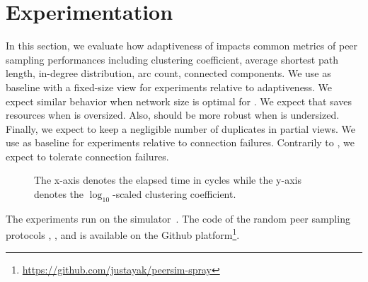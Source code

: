 \section{Experimentation}
\label{sec:experiments}

In this section, we evaluate how adaptiveness of \SPRAY impacts common metrics
of peer sampling performances including clustering coefficient, average
shortest path length, in-degree distribution, arc count, connected
components. We use \CYCLON as baseline with a fixed-size view for experiments
relative to adaptiveness. We expect similar behavior when network size is
optimal for \CYCLON. We expect that \SPRAY saves resources when \CYCLON is
oversized. Also, \SPRAY should be more robust when \CYCLON is
undersized. Finally, we expect \SPRAY to keep a negligible number of duplicates
in partial views. We use \SCAMP as baseline for experiments relative to
connection failures. Contrarily to \SCAMP, we expect \SPRAY to tolerate
connection failures.

\begin{figure}
  \centering
  \hspace{10pt}
  \caption{\label{fig:clustering}The x-axis denotes the elapsed time in cycles
    while the y-axis denotes the $\log_{10}$-scaled clustering coefficient.}
\end{figure}


The experiments run on the \PEERSIM
simulator~\cite{montresor2009peersim}. The code of the random peer sampling
protocols \CYCLON, \SCAMP, and \SPRAY is available on the Github
platform\footnote{\url{https://github.com/justayak/peersim-spray}}.

